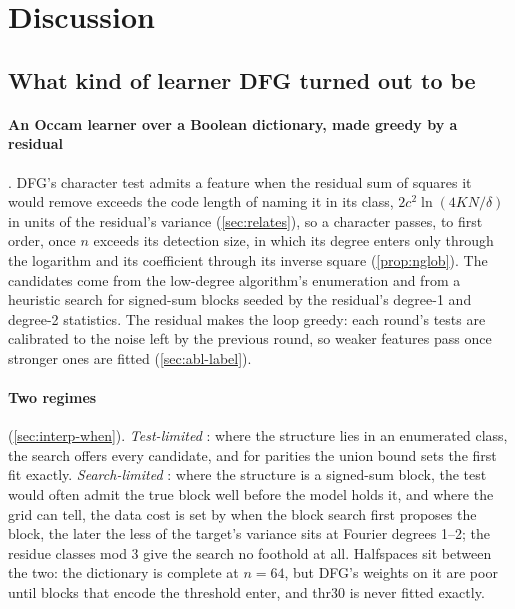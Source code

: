 \section{Discussion}\label{sec:discussion}

\subsection{What kind of learner DFG turned out to be}\label{sec:disc-kind}

\paragraph{An Occam learner over a Boolean dictionary, made greedy by a residual} . DFG's character test admits a feature when the residual sum of squares it would remove exceeds the code length of naming it in its class, $2c^2\ln(4KN/\delta)$ in units of the residual's variance (\cref{sec:relates}), so a character passes, to first order, once $n$ exceeds its detection size, in which its degree enters only through the logarithm and its coefficient through its inverse square (\cref{prop:nglob}). The candidates come from the low-degree algorithm's enumeration and from a heuristic search for signed-sum blocks seeded by the residual's degree-1 and degree-2 statistics. The residual makes the loop greedy: each round's tests are calibrated to the noise left by the previous round, so weaker features pass once stronger ones are fitted (\cref{sec:abl-label}).

\paragraph{Two regimes} (\cref{sec:interp-when}). \emph{Test-limited} : where the structure lies in an enumerated class, the search offers every candidate, and for parities the union bound sets the first fit exactly. \emph{Search-limited} : where the structure is a signed-sum block, the test would often admit the true block well before the model holds it, and where the grid can tell, the data cost is set by when the block search first proposes the block, the later the less of the target's variance sits at Fourier degrees 1--2; the residue classes mod 3 give the search no foothold at all. Halfspaces sit between the two: the dictionary is complete at $n=64$, but DFG's weights on it are poor until blocks that encode the threshold enter, and thr30 is never fitted exactly.

